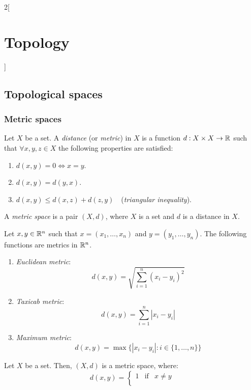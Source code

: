 \documentclass[../../../main.tex]{subfiles}
\begin{document}
\begin{multicols}{2}[\section{Topology}]
    \subsection{Topological spaces}
    \subsubsection{Metric spaces}
    \begin{definition}
        Let $X$ be a set. A \emph{distance} (or \emph{metric}) in $X$ is a function $d:X\times X\rightarrow\RR $ such that $\forall x,y,z\in X$ the following properties are satisfied:
        \begin{enumerate}
            \item $d(x,y)=0\iff x=y$.
            \item $d(x,y)=d(y,x)$.
            \item $d(x,y)\leq d(x,z)+d(z,y)\quad$(\emph{triangular inequality}).
        \end{enumerate}
    \end{definition}
    \begin{definition}
        A \emph{metric space} is a pair $(X,d)$, where $X$ is a set and $d$ is a distance in $X$.
    \end{definition}
    \begin{prop}
        Let $x,y\in\RR^n$ such that $x=(x_1,\ldots,x_n)$ and $y=(y_1,\ldots,y_n)$. The following functions are metrics in $\RR^n$.
        \begin{enumerate}
            \item \emph{Euclidean metric}: $$d(x,y)=\sqrt{\sum_{i=1}^n{(x_i-y_i)}^2}$$
            \item \emph{Taxicab metric}: $$d(x,y)=\sum_{i=1}^n|x_i-y_i|$$
            \item \emph{Maximum metric}: $$d(x,y)=\max\{|x_i-y_i|:i\in\{1,\ldots,n\}\}$$
        \end{enumerate}
    \end{prop}
    \begin{prop}
        Let $X$ be a set. Then, $(X,d)$ is a metric space, where: $$d(x,y)=
            \left\{\begin{array}{lcc}
                1 & \text{if} & x\ne y \\

\end{array}$$
\end{prop}
\end{multicols}
\end{document}
